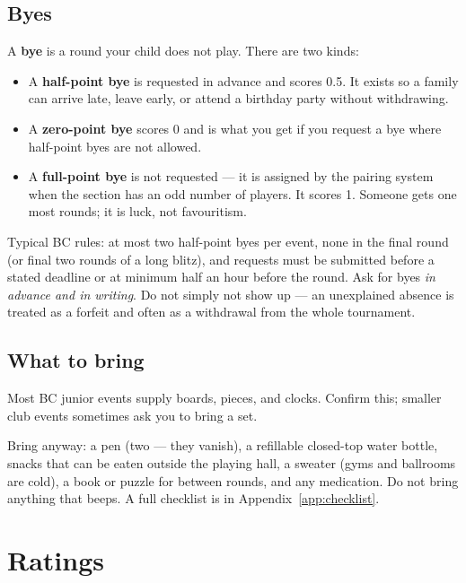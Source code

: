 \documentclass[10pt,letterpaper]{article}
\newcommand{\term}[1]{\textbf{#1}}
\begin{document}
\subsection{Byes}

A \term{bye} is a round your child does not play. There are two kinds:

\begin{itemize}
  \item A \term{half-point bye} is requested in advance and scores 0.5. It
        exists so a family can arrive late, leave early, or attend a birthday
        party without withdrawing.
  \item A \term{zero-point bye} scores 0 and is what you get if you request a
        bye where half-point byes are not allowed.
  \item A \term{full-point bye} is not requested --- it is assigned by the
        pairing system when the section has an odd number of players. It scores
        1. Someone gets one most rounds; it is luck, not favouritism.
\end{itemize}

Typical BC rules: at most two half-point byes per event, none in the final
round (or final two rounds of a long blitz), and requests must be submitted
before a stated deadline or at minimum half an hour before the round. Ask for
byes \emph{in advance and in writing}. Do not simply not show up --- an
unexplained absence is treated as a forfeit and often as a withdrawal from the
whole tournament.

\subsection{What to bring}

Most BC junior events supply boards, pieces, and clocks. Confirm this; smaller
club events sometimes ask you to bring a set.

Bring anyway: a pen (two --- they vanish), a refillable closed-top water bottle,
snacks that can be eaten outside the playing hall, a sweater (gyms and ballrooms
are cold), a book or puzzle for between rounds, and any medication. Do not
bring anything that beeps. A full checklist is in
Appendix~\ref{app:checklist}.

\section{Ratings}
\label{sec:ratings}
\end{document}
